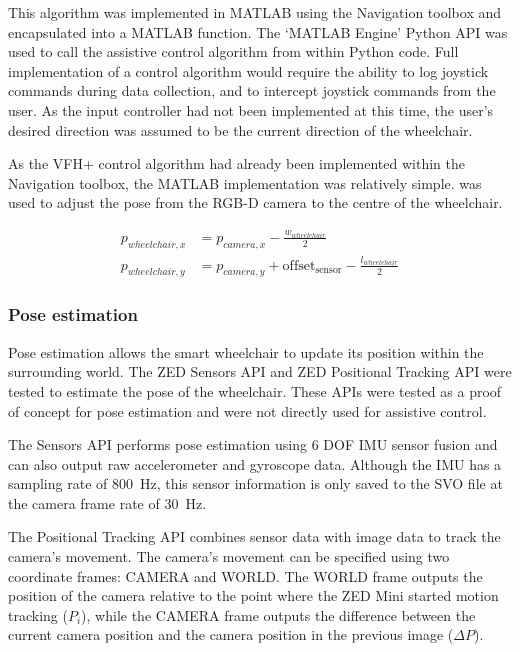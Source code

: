 This algorithm was implemented in MATLAB using the Navigation toolbox and encapsulated into a MATLAB function.
The `MATLAB Engine' Python API was used to call the assistive control algorithm from within Python code.
Full implementation of a control algorithm would require the ability to log joystick commands during
data collection, and to intercept joystick commands from the user. As the input controller had not
been implemented at this time, the user's desired direction was assumed to be the current direction
of the wheelchair.

As the VFH+ control algorithm had already been implemented within the Navigation toolbox,
the MATLAB implementation was relatively simple.  was used to adjust
the pose from the RGB-D camera to the centre of the wheelchair.

\begin{equation}
\begin{split}
p_{wheelchair,x} &= p_{camera,x} - \frac{w_{wheelchair}}{2}\\
p_{wheelchair,y} &= p_{camera,y} + \mathrm{offset_{sensor}} - \frac{l_{wheelchair}}{2}
\end{split}
\label{eq:pose_adjustment}
\end{equation}

\subsubsection{Pose estimation}
Pose estimation allows the smart wheelchair to update its position within the surrounding world.
The ZED Sensors API and ZED Positional Tracking API were tested to estimate the pose of the wheelchair.
These APIs were tested as a proof of concept for pose estimation and were not directly used
for assistive control.

\pagebreak
The Sensors API performs pose estimation using 6 DOF IMU sensor fusion and can also output raw accelerometer
and gyroscope data. Although the IMU has a sampling rate of \SI{800}{\hertz}, this sensor information
is only saved to the SVO file at the camera frame rate of \SI{30}{\hertz}.

The Positional Tracking API combines sensor data with image data to track the camera's movement.
The camera's movement can be specified using two coordinate frames: CAMERA and WORLD.
The WORLD frame outputs the position of the camera relative to the point where the ZED Mini started
motion tracking ($P_i$), while the CAMERA frame outputs the difference between the current camera position and
the camera position in the previous image ($\Delta P$).

